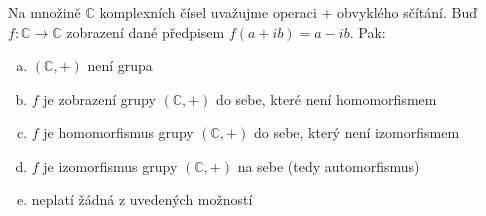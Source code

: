 \subsubsection{}
Na množině $\mathbb{C}$ komplexních čísel uvažujme operaci + obvyklého sčítání.
Buď $f: \mathbb{C} \rightarrow \mathbb{C}$ zobrazení dané předpisem $f(a+ib) = a
- ib$. Pak:
\begin{enumerate}[a)]
  \item $(\mathbb{C},+)$ není grupa
  \item $f$ je zobrazení grupy $(\mathbb{C},+)$ do sebe, které není
    homomorfismem
  \item $f$ je homomorfismus grupy $(\mathbb{C},+)$ do sebe, který není
    izomorfismem
  \item $f$ je izomorfismus grupy $(\mathbb{C},+)$ na sebe (tedy automorfismus)
  \item neplatí žádná z uvedených možností
\end{enumerate}
